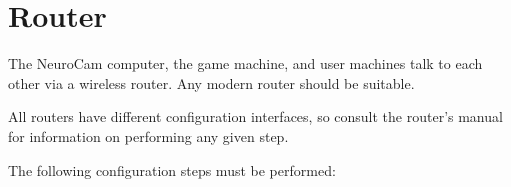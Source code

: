 
\chapter{Router}
\label{router}

The NeuroCam computer, the game machine, and user machines talk to each other
via a wireless router. Any modern router should be suitable.

All routers have different configuration interfaces, so consult the router's
manual for information on performing any given step.

The following configuration steps must be performed:
